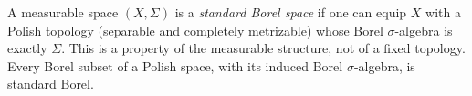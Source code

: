 
A measurable space $(X,\Sigma)$ is a \emph{standard Borel space} if one can equip $X$ with a Polish topology (separable and completely metrizable) whose Borel $\sigma$-algebra is exactly $\Sigma$. This is a property of the measurable structure, not of a fixed topology. Every Borel subset of a Polish space, with its induced Borel $\sigma$-algebra, is standard Borel.
